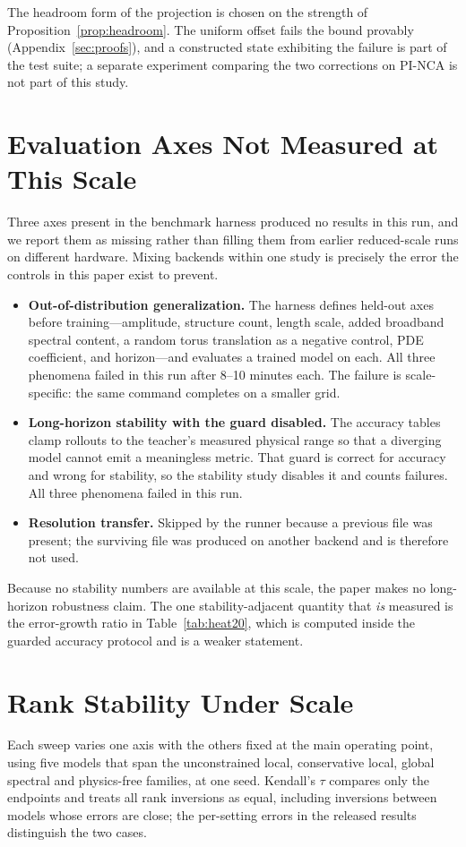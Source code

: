 The headroom form of the projection is chosen on the strength of
Proposition~\ref{prop:headroom}. The uniform offset fails the bound provably
(Appendix~\ref{sec:proofs}), and a constructed state exhibiting the failure is part of the
test suite; a separate experiment comparing the two corrections on PI-NCA is not part of
this study.

\section{Evaluation Axes Not Measured at This Scale}
\label{sec:notmeasured}
Three axes present in the benchmark harness produced no results in this run, and we
report them as missing rather than filling them from earlier reduced-scale runs on
different hardware. Mixing backends within one study is precisely the error the controls
in this paper exist to prevent.

\begin{itemize}
\item \textbf{Out-of-distribution generalization.} The harness defines held-out axes
before training---amplitude, structure count, length scale, added broadband spectral
content, a random torus translation as a negative control, PDE coefficient, and
horizon---and evaluates a trained model on each. All three phenomena failed in this run
after 8--10 minutes each. The failure is scale-specific: the same command completes on a
smaller grid.
\item \textbf{Long-horizon stability with the guard disabled.} The accuracy tables clamp
rollouts to the teacher's measured physical range so that a diverging model cannot emit a
meaningless metric. That guard is correct for accuracy and wrong for stability, so the
stability study disables it and counts failures. All three phenomena failed in this run.
\item \textbf{Resolution transfer.} Skipped by the runner because a previous file was
present; the surviving file was produced on another backend and is therefore not used.
\end{itemize}

Because no stability numbers are available at this scale, the paper makes no long-horizon
robustness claim. The one stability-adjacent quantity that \emph{is} measured is the
error-growth ratio in Table~\ref{tab:heat20}, which is computed inside the guarded
accuracy protocol and is a weaker statement.

\section{Rank Stability Under Scale}
\label{sec:scaling-details}

Each sweep varies one axis with the others fixed at the main operating point, using five
models that span the unconstrained local, conservative local, global spectral and
physics-free families, at one seed. Kendall's $\tau$ compares only the endpoints and treats
all rank inversions as equal, including inversions between models whose errors are close;
the per-setting errors in the released results distinguish the two cases.

